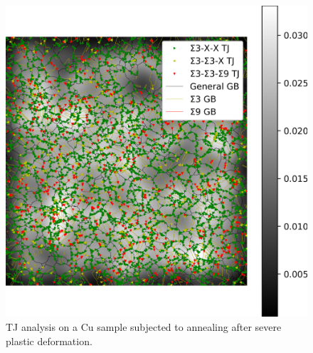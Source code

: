 \documentclass{article}
\begin{document}
\begin{figure}[ht]
\centering
\includegraphics[width=\linewidth]{figs/Cu_TJ_analysis}
\caption{TJ analysis on a Cu sample subjected to annealing after severe plastic deformation.}
\label{fig:Cu_SPD}
\end{figure}
\end{document}
